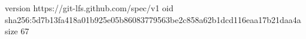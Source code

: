 version https://git-lfs.github.com/spec/v1
oid sha256:5d7b13fa418a01b925e05b86083779563be2c858a62b1dcd116eaa17b21daa4a
size 67

